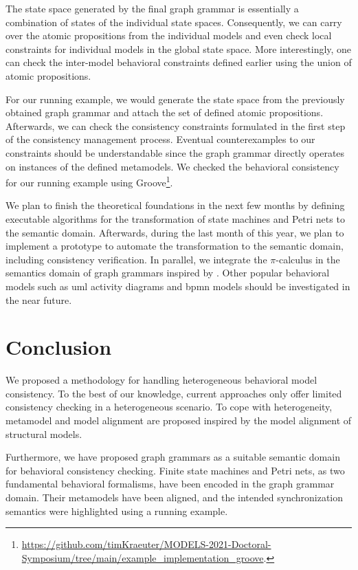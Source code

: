 \documentclass[conference]{IEEEtran}
\begin{document}
The state space generated by the final graph grammar is essentially a combination of states of the individual state spaces.
Consequently, we can carry over the atomic propositions from the individual models and even check local constraints for individual models in the global state space.
More interestingly, one can check the inter-model behavioral constraints defined earlier using the union of atomic propositions.

For our running example, we would generate the state space from the previously obtained graph grammar and attach the set of defined atomic propositions.
Afterwards, we can check the consistency constraints formulated in the first step of the consistency management process.
Eventual counterexamples to our constraints should be understandable since the graph grammar directly operates on instances of the defined metamodels.
We checked the behavioral consistency for our running example using Groove\footnote{\url{https://github.com/timKraeuter/MODELS-2021-Doctoral-Symposium/tree/main/example_implementation_groove}.}.

We plan to finish the theoretical foundations in the next few months by defining executable algorithms for the transformation of state machines and Petri nets to the semantic domain.
Afterwards, during the last month of this year, we plan to implement a prototype to automate the transformation to the semantic domain, including consistency verification.
In parallel, we integrate the $\pi$-calculus in the semantics domain of graph grammars inspired by \cite{gadducciGraphRewritingPcalculus2007}.
Other popular behavioral models such as \gls{uml} activity diagrams and \gls{bpmn} models should be investigated in the near future. 


\section{Conclusion}
We proposed a methodology for handling heterogeneous behavioral model consistency.
To the best of our knowledge, current approaches only offer limited consistency checking in a heterogeneous scenario.
To cope with heterogeneity, metamodel and model alignment are proposed inspired by the model alignment of structural models.

Furthermore, we have proposed graph grammars as a suitable semantic domain for behavioral consistency checking.
Finite state machines and Petri nets, as two fundamental behavioral formalisms, have been encoded in the graph grammar domain.
Their metamodels have been aligned, and the intended synchronization semantics were highlighted using a running example. 
\end{document}
